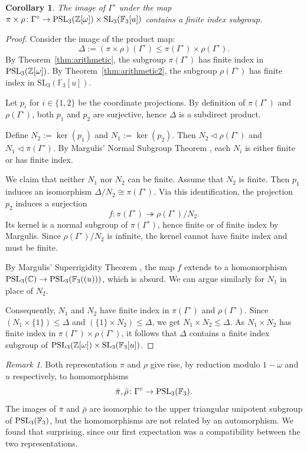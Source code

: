 \documentclass[11pt, a4paper]{amsproc}
\newcommand{\F}{\mathbb{F}}
\newcommand{\SL}{\mathrm{SL}}
\newtheorem{corollary}[cor]{Corollary}
\theoremstyle{remark}
\newtheorem{remark}{Remark}
\theoremstyle{plain}
\begin{document}
\begin{corollary}
The image of $\Gamma^\circ$ under the map $\pi \times \rho \colon \Gamma^\circ \to {\rm PSL}_3(\mathbb Z[\omega]) \times \SL_3(\F_3[u])$ contains a finite index subgroup.
\end{corollary}
\begin{proof}
Consider the image of the product map:
\[
\Delta:=(\pi\times\rho)(\Gamma^\circ)\le \pi(\Gamma^\circ)\times\rho(\Gamma^\circ).
\]
By Theorem~\ref{thm:arithmetic}, the subgroup $\pi(\Gamma^{\circ})$ has finite index in ${\rm PSL}_3(\mathbb Z[\omega])$.
By Theorem~\ref{thm:arithmetic2}, the subgroup $\rho(\Gamma^{\circ})$ has finite index in $\SL_3(\F_3[u])$.

Let $p_i$ for $i \in \{1,2\}$ be the coordinate projections. By definition of $\pi(\Gamma^{\circ})$ and $\rho(\Gamma^{\circ})$, both $p_1$ and $p_2$ are
surjective, hence $\Delta$ is a subdirect product.

Define $N_2:=\ker(p_1)$ and $N_1:=\ker(p_2)$. Then $N_2\lhd\rho(\Gamma^{\circ})$ and $N_1\lhd\pi(\Gamma^{\circ})$. By Margulis' Normal Subgroup Theorem \cite{Margulis}, each $N_i$ is either finite or has finite index.

We claim that neither $N_1$ nor $N_2$ can be finite. Assume that $N_2$ is finite.
Then $p_1$ induces an isomorphism $\Delta/N_2\cong \pi(\Gamma^{\circ})$.
Via this identification, the projection $p_2$ induces a surjection
\[
f:\pi(\Gamma^{\circ})\twoheadrightarrow \rho(\Gamma^{\circ})/N_2.
\]
Its kernel is a normal subgroup of $\pi(\Gamma^{\circ})$, hence finite or of finite index by Margulis.
Since $\rho(\Gamma^{\circ})/N_2$ is infinite, the kernel cannot have finite index and must be finite.

By Margulis' Superrigidity Theorem \cite{Margulis}, the map $f$ extends to a homomorphism ${\rm PSL}_3(\mathbb C)\to {\rm PSL}_3(\F_3((u)))$, which is absurd. We can argue similarly for $N_1$ in place of $N_2$.

Consequently, $N_1$ and $N_2$ have finite index in $\pi(\Gamma^{\circ})$ and $\rho(\Gamma^{\circ})$.
Since $(N_1\times\{1\})\le\Delta$ and $(\{1\}\times N_2)\le\Delta$, we get $N_1\times N_2\le \Delta$.
As $N_1\times N_2$ has finite index in $\pi(\Gamma^{\circ})\times\rho(\Gamma^{\circ})$, it follows that $\Delta$ contains a finite index subgroup of
${\rm PSL}_3(\mathbb Z[\omega]) \times \SL_3(\F_3[u])$.
\end{proof}

\begin{remark}
Both representation $\pi$ and $\rho$ give rise, by reduction modulo $1-\omega$ and $u$ respectively, to homomorphisms
\[
\bar \pi, \bar \rho \colon \Gamma^\circ \to {\rm PSL}_3(\mathbb F_3).
\]
The images of $\bar \pi$ and $\bar \rho$ are isomorphic to the upper triangular unipotent subgroup of ${\rm PSL}_3(\mathbb F_3)$, but the homomorphisms are not related by an automorphism. We found that surprising, since our first expectation was a compatibility between the two representations.
\end{remark}
\end{document}
